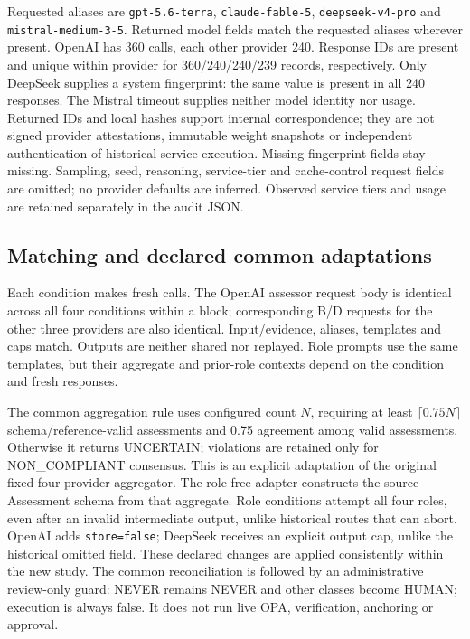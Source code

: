 \begin{revision}
Requested aliases are \texttt{gpt-5.6-terra}, \texttt{claude-fable-5},
\texttt{deepseek-v4-pro} and \texttt{mistral-medium-3-5}. Returned model fields
match the requested aliases wherever present. OpenAI has 360 calls, each
other provider 240. Response IDs are present and unique within provider for
360/240/240/239 records, respectively. Only DeepSeek supplies a system
fingerprint: the same value is present in all 240 responses. The Mistral
timeout supplies neither model identity nor usage. Returned IDs and local
hashes support internal correspondence; they are not signed provider
attestations, immutable weight snapshots or independent authentication of
historical service execution. Missing fingerprint fields stay missing.
Sampling, seed, reasoning, service-tier and cache-control request fields
are omitted; no provider defaults are inferred. Observed service tiers and
usage are retained separately in the audit JSON.

\subsection{Matching and declared common adaptations}
Each condition makes fresh calls. The OpenAI assessor request body is
identical across all four conditions within a block; corresponding B/D
requests for the other three providers are also identical. Input/evidence,
aliases, templates and caps match. Outputs are neither shared nor replayed.
Role prompts use the same templates, but their aggregate and prior-role
contexts depend on the condition and fresh responses.

The common aggregation rule uses configured count $N$, requiring at least
$\lceil0.75N\rceil$ schema/reference-valid assessments and 0.75 agreement
among valid assessments. Otherwise it returns UNCERTAIN; violations are
retained only for NON\_COMPLIANT consensus. This is an explicit adaptation
of the original fixed-four-provider aggregator. The role-free adapter
constructs the source Assessment schema from that aggregate. Role conditions
attempt all four roles, even after an invalid intermediate output, unlike
historical routes that can abort. OpenAI adds \texttt{store=false}; DeepSeek
receives an explicit output cap, unlike the historical omitted field.
These declared changes are applied consistently within the new study.
The common reconciliation is followed by an administrative review-only
guard: NEVER remains NEVER and other classes become HUMAN; execution is
always false. It does not run live OPA, verification, anchoring or approval.


\end{revision}
